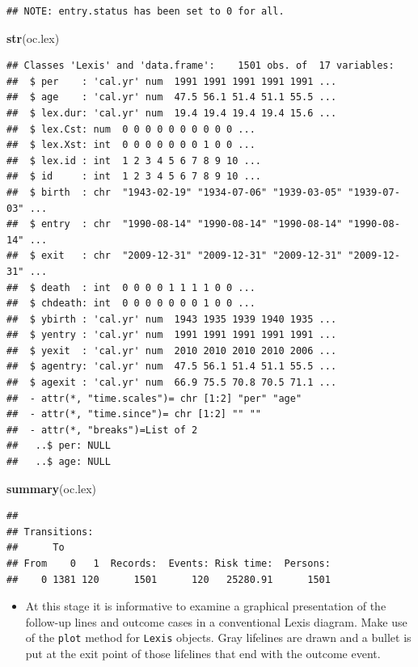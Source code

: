 \documentclass[
]{book}
\newenvironment{Shaded}{\begin{snugshade}}{\end{snugshade}}
\newcommand{\FunctionTok}[1]{\textcolor[rgb]{0.13,0.29,0.53}{\textbf{#1}}}
\newcommand{\NormalTok}[1]{#1}
\providecommand{\tightlist}{%
  \setlength{\itemsep}{0pt}\setlength{\parskip}{0pt}}
\begin{document}
\begin{verbatim}
## NOTE: entry.status has been set to 0 for all.
\end{verbatim}

\begin{Shaded}
\begin{Highlighting}[]
\FunctionTok{str}\NormalTok{(oc.lex)}
\end{Highlighting}
\end{Shaded}

\begin{verbatim}
## Classes 'Lexis' and 'data.frame':    1501 obs. of  17 variables:
##  $ per    : 'cal.yr' num  1991 1991 1991 1991 1991 ...
##  $ age    : 'cal.yr' num  47.5 56.1 51.4 51.1 55.5 ...
##  $ lex.dur: 'cal.yr' num  19.4 19.4 19.4 19.4 15.6 ...
##  $ lex.Cst: num  0 0 0 0 0 0 0 0 0 0 ...
##  $ lex.Xst: int  0 0 0 0 0 0 0 1 0 0 ...
##  $ lex.id : int  1 2 3 4 5 6 7 8 9 10 ...
##  $ id     : int  1 2 3 4 5 6 7 8 9 10 ...
##  $ birth  : chr  "1943-02-19" "1934-07-06" "1939-03-05" "1939-07-03" ...
##  $ entry  : chr  "1990-08-14" "1990-08-14" "1990-08-14" "1990-08-14" ...
##  $ exit   : chr  "2009-12-31" "2009-12-31" "2009-12-31" "2009-12-31" ...
##  $ death  : int  0 0 0 0 1 1 1 1 0 0 ...
##  $ chdeath: int  0 0 0 0 0 0 0 1 0 0 ...
##  $ ybirth : 'cal.yr' num  1943 1935 1939 1940 1935 ...
##  $ yentry : 'cal.yr' num  1991 1991 1991 1991 1991 ...
##  $ yexit  : 'cal.yr' num  2010 2010 2010 2010 2006 ...
##  $ agentry: 'cal.yr' num  47.5 56.1 51.4 51.1 55.5 ...
##  $ agexit : 'cal.yr' num  66.9 75.5 70.8 70.5 71.1 ...
##  - attr(*, "time.scales")= chr [1:2] "per" "age"
##  - attr(*, "time.since")= chr [1:2] "" ""
##  - attr(*, "breaks")=List of 2
##   ..$ per: NULL
##   ..$ age: NULL
\end{verbatim}

\begin{Shaded}
\begin{Highlighting}[]
\FunctionTok{summary}\NormalTok{(oc.lex)}
\end{Highlighting}
\end{Shaded}

\begin{verbatim}
##     
## Transitions:
##      To
## From    0   1  Records:  Events: Risk time:  Persons:
##    0 1381 120      1501      120   25280.91      1501
\end{verbatim}

\begin{itemize}
\tightlist
\item
  At this stage it is informative to examine a graphical
  presentation of the follow-up lines and outcome cases in a conventional
  Lexis diagram. Make use of the \texttt{plot} method for \texttt{Lexis} objects.
  Gray lifelines are drawn and a bullet is put at the exit point of those lifelines
  that end with the outcome event.
\end{itemize}
\end{document}
